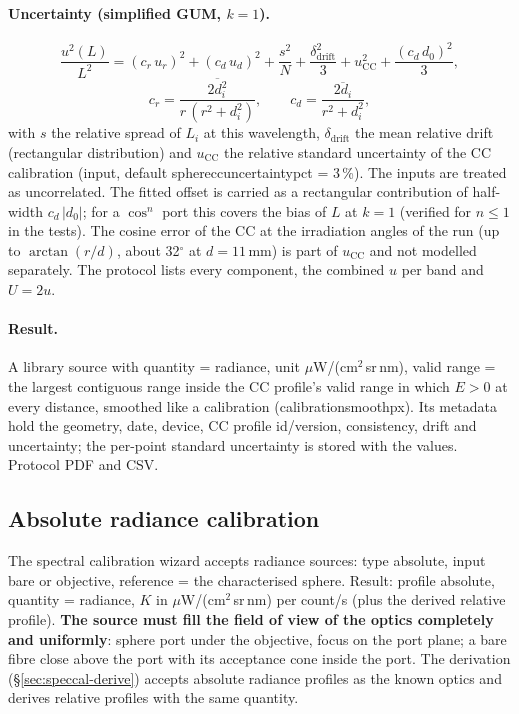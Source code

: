 \documentclass[12pt,a4paper]{article}
\DeclareRobustCommand{\code}[1]{{\ttfamily\small\def\_{\rawus\allowbreak}#1}}
\DeclareRobustCommand{\key}[1]{{\ttfamily\small\color{acc2}\def\_{\rawus\allowbreak}#1}}
\begin{document}
\paragraph{Uncertainty (simplified GUM, $k=1$).}
\[
  \frac{u^2(L)}{L^2} = (c_r\,u_r)^2 + (c_d\,u_d)^2 + \frac{s^2}{N}
     + \frac{\delta_{\mathrm{drift}}^2}{3} + u_{\mathrm{CC}}^2
     + \frac{(c_d\,d_0)^2}{3} ,
\]
\[
  c_r = \overline{\frac{2d_i^2}{r\,(r^2+d_i^2)}}, \qquad
  c_d = \overline{\frac{2d_i}{r^2+d_i^2}},
\]
with $s$ the relative spread of $L_i$ at this wavelength, $\delta_{\mathrm{drift}}$
the mean relative drift (rectangular distribution) and $u_{\mathrm{CC}}$ the
relative standard uncertainty of the CC calibration (input, default
\key{sphere\_cc\_uncertainty\_pct} = 3\,\%). The inputs are treated as
uncorrelated. The fitted offset is carried as a rectangular contribution of
half-width $c_d\,|d_0|$; for a $\cos^n$ port this covers the bias of $L$ at
$k=1$ (verified for $n\le 1$ in the tests). The cosine error of the CC at the
irradiation angles of the run (up to $\arctan(r/d)$, about 32$^\circ$ at
$d=11$\,mm) is part of $u_{\mathrm{CC}}$ and not modelled separately. The
protocol lists every component, the combined $u$ per band and $U=2u$.

\paragraph{Result.}
A library source with \code{quantity = radiance}, unit $\mu$W/(cm$^2$\,sr\,nm),
valid range = the largest contiguous range inside the CC profile's valid range
in which $E>0$ at every distance, smoothed like a calibration
(\key{calibration\_smooth\_px}). Its metadata hold the geometry, date, device,
CC profile id/version, consistency, drift and uncertainty; the per-point
standard uncertainty is stored with the values. Protocol PDF and CSV.

\subsection{Absolute radiance calibration}
The spectral calibration wizard accepts radiance sources: type absolute,
input bare or objective, reference = the characterised sphere. Result: profile
\code{absolute}, \code{quantity = radiance},
$K$ in $\mu$W/(cm$^2$\,sr\,nm) per count/s (plus the derived relative profile).
\textbf{The source must fill the field of view of the optics completely and
uniformly}: sphere port under the objective, focus on the port plane; a bare
fibre close above the port with its acceptance cone inside the port. The
derivation (\S\ref{sec:speccal-derive}) accepts absolute radiance profiles as
the known optics and derives relative profiles with the same quantity.
\end{document}
